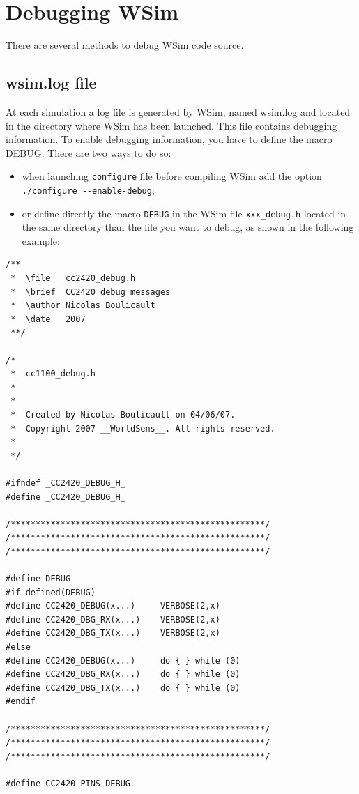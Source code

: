 \documentclass[a4paper,10pt]{report}
\begin{document}
\chapter{Debugging WSim}

There are several methods to debug WSim code source.

\section{wsim.log file}

At each simulation a log file is generated by WSim, named wsim.log and located in the directory where WSim has been launched. This file contains debugging information.
To enable debugging information, you have to define the macro DEBUG. There are two ways to do so:

\begin{itemize}
  \item when launching \verb$configure$ file before compiling WSim add the option \verb$./configure --enable-debug$;
  \item or define directly the macro \verb$DEBUG$ in the WSim file \verb$xxx_debug.h$ located in the same directory than the file you want to debug, as shown in the following example:
\end{itemize}

\begin{verbatim}
/**
 *  \file   cc2420_debug.h
 *  \brief  CC2420 debug messages 
 *  \author Nicolas Boulicault
 *  \date   2007
 **/

/*
 *  cc1100_debug.h
 *  
 *
 *  Created by Nicolas Boulicault on 04/06/07.
 *  Copyright 2007 __WorldSens__. All rights reserved.
 *
 */

#ifndef _CC2420_DEBUG_H_
#define _CC2420_DEBUG_H_

/***************************************************/
/***************************************************/
/***************************************************/

#define DEBUG
#if defined(DEBUG)
#define CC2420_DEBUG(x...)     VERBOSE(2,x)
#define CC2420_DBG_RX(x...)    VERBOSE(2,x)
#define CC2420_DBG_TX(x...)    VERBOSE(2,x)
#else
#define CC2420_DEBUG(x...)     do { } while (0)
#define CC2420_DBG_RX(x...)    do { } while (0)
#define CC2420_DBG_TX(x...)    do { } while (0)
#endif

/***************************************************/
/***************************************************/
/***************************************************/

#define CC2420_PINS_DEBUG

\end{verbatim}
\end{document}
